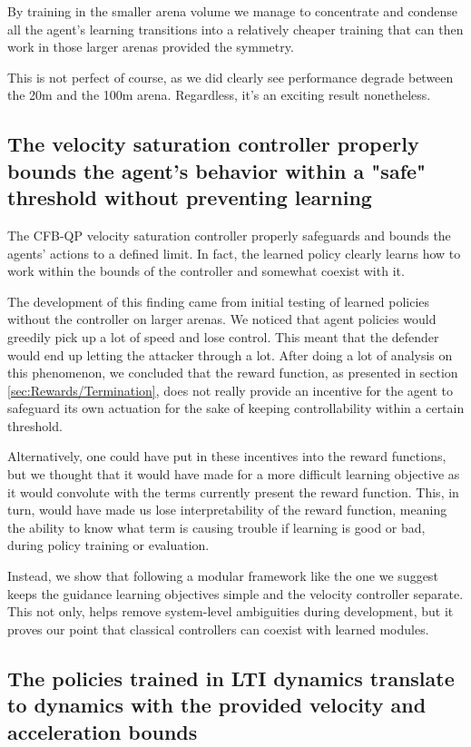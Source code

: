  By training in the smaller arena volume we manage to concentrate and condense all the agent's learning transitions into a relatively cheaper training that can then work in those larger arenas provided the symmetry.

 This is not perfect of course, as we did clearly see performance degrade between the 20m and the 100m arena. Regardless, it's an exciting result nonetheless.


\subsection*{The velocity saturation controller properly bounds the agent's behavior within a "safe" threshold without preventing learning}

The CFB-QP velocity saturation controller properly safeguards and bounds the agents' actions to a defined limit. In fact, the learned policy clearly learns how to work within the bounds of the controller and somewhat coexist with it. 
    
The development of this finding came from initial testing of learned policies without the controller on larger arenas. We noticed that agent policies would greedily pick up a lot of speed and lose control. This meant that the defender would end up letting the attacker through a lot. After doing a lot of analysis on this phenomenon, we concluded that the reward function, as presented in section \ref{sec:Rewards/Termination}, does not really provide an incentive for the agent to safeguard its own actuation for the sake of keeping controllability within a certain threshold.

Alternatively, one could have put in these incentives into the reward functions, but we thought that it would have made for a more difficult learning objective as it would convolute with the terms currently present the reward function. This, in turn, would have made us lose interpretability of the reward function, meaning the ability to know what term is causing trouble if learning is good or bad, during policy training or evaluation.

Instead, we show that following a modular framework like the one we suggest keeps the guidance learning objectives simple and the velocity controller separate. This not only, helps remove system-level ambiguities during development, but it proves our point that classical controllers can coexist with learned modules.


\subsection*{The policies trained in LTI dynamics translate to dynamics with the provided velocity and acceleration bounds}

